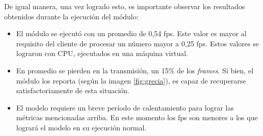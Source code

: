 De igual manera, una vez logrado esto, es importante observar los resultados obtenidos durante la ejecución del módulo: 

\begin{itemize}
	\item El módulo se ejecutó con un promedio de 0,54 fps. Este valor es mayor al requisito del cliente de procesar un número mayor a 0,25 fps. Estos valores se lograron con CPU, ejecutados en una máquina virtual.
	\item En promedio se pierden en la transmisión, un 15\% de los \textit{frames}. Si bien, el módulo los reporta (según la imagen \ref{fig:grecia}), es capaz de recuperarse satisfactoriamente de esta situación.
	\item El modelo requiere un breve período de calentamiento para lograr las métricas mencionadas arriba. En este momento los fps son menores a los que logrará el modelo en su ejecución normal. 

\end{itemize}